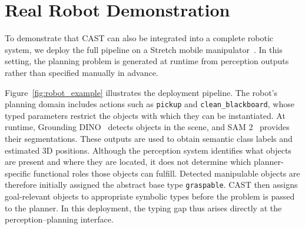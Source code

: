 \section{Real Robot Demonstration}


To demonstrate that CAST can also be integrated into a complete robotic system, we deploy the full pipeline on a Stretch mobile manipulator~\cite{stretch}. In this setting, the planning problem is generated at runtime from perception outputs rather than specified manually in advance.

Figure~\ref{fig:robot_example} illustrates the deployment pipeline. The robot's planning domain includes actions such as \texttt{pickup} and \texttt{clean\_blackboard}, whose typed parameters restrict the objects with which they can be instantiated. At runtime, Grounding DINO~\cite{gdino} detects objects in the scene, and SAM 2~\cite{sam} provides their segmentations. These outputs are used to obtain semantic class labels and estimated 3D positions. Although the perception system identifies what objects are present and where they are located, it does not determine which planner-specific functional roles those objects can fulfill. Detected manipulable objects are therefore initially assigned the abstract base type \texttt{graspable}. CAST then assigns goal-relevant objects to appropriate symbolic types before the problem is passed to the planner. In this deployment, the typing gap thus arises directly at the perception--planning interface.


